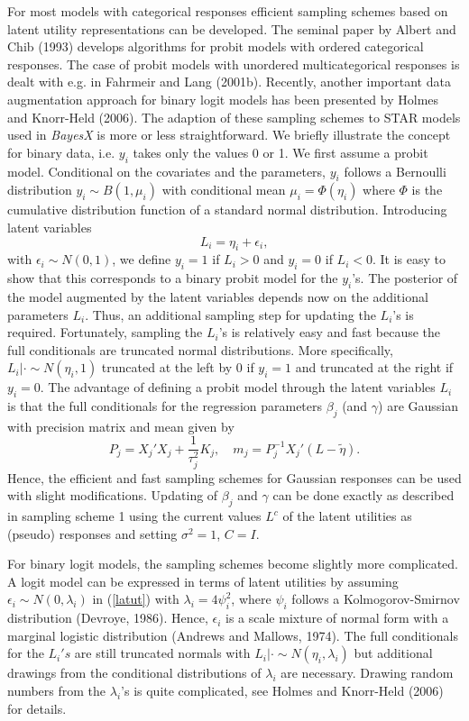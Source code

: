 \documentclass[11pt,a4paper,twoside]{bayesxarticle}
\begin{document}
For most models with categorical responses efficient sampling
schemes based on latent utility representations can be developed.
The seminal paper by Albert and Chib (1993) develops algorithms for
probit models  with  ordered categorical responses. The case of
probit models with unordered multicategorical responses is dealt
with e.g. in Fahrmeir and Lang (2001b). Recently, another important
data augmentation approach for binary logit models has been
presented by Holmes and Knorr-Held (2006). The adaption of these
sampling schemes to STAR models used in {\em BayesX} is more or less
straightforward. We briefly illustrate the concept for binary data,
i.e. $y_i$ takes only the values 0 or 1. We first assume a probit
model. Conditional on the covariates and the parameters, $y_i$
follows a Bernoulli distribution $y_i \sim B(1,\mu_i)$ with
conditional mean $\mu_i = \Phi(\eta_i)$ where $\Phi$ is the
cumulative distribution function of a standard normal distribution.
Introducing latent variables
\begin{equation}
\label{latut} L_i = \eta_i + \epsilon_i,
\end{equation}
with $\epsilon_i \sim N(0,1)$, we define $y_i = 1$ if $L_i > 0$
and $y_i=0$ if $L_i < 0$. It is easy to show that this corresponds
to a binary probit model for the $y_i$'s. The posterior of the
model augmented by the latent variables depends now on the
additional parameters $L_i$. Thus, an additional sampling step for
updating the $L_i$'s is required. Fortunately, sampling the
$L_i$'s is relatively easy and fast because the full conditionals
are truncated normal distributions. More specifically, $L_i |
\cdot \sim N(\eta_i,1)$ truncated at the left by 0 if $y_i=1$ and
truncated at the right if $y_i=0$. The advantage of defining a
probit model through the latent variables $L_i$ is that the full
conditionals for the regression parameters $\beta_j$ (and
$\gamma$) are Gaussian with precision matrix and mean given by
\begin{equation}
\label{prec2} P_j = X_j'X_j + \frac{1}{\tau^2_j}K_j, \quad m_j =
P_j^{-1}X_j'(L-\tilde{\eta}).
\end{equation}
Hence, the efficient and fast sampling schemes for Gaussian
responses can be used with slight modifications. Updating of
$\beta_j$ and $\gamma$ can be done exactly as described in
sampling scheme 1  using the current values $L^c$ of the latent
utilities as (pseudo) responses and setting $\sigma^2=1$, $C=I$.

For binary logit models, the sampling schemes become slightly more
complicated. A logit model can be expressed in terms of latent
utilities by assuming $\epsilon_i \sim N(0,\lambda_i)$ in
(\ref{latut}) with $\lambda_i = 4\psi_i^2$, where $\psi_i$ follows a
Kolmogorov-Smirnov distribution (Devroye, 1986). Hence, $\epsilon_i$
is  a scale mixture of normal form with a marginal logistic
distribution (Andrews and Mallows, 1974). The full conditionals for
the $L_i's$ are still truncated normals with $L_i | \cdot \sim
N(\eta_i,\lambda_i)$ but additional drawings from the conditional
distributions of $\lambda_i$ are necessary. Drawing random numbers
from the $\lambda_i$'s is quite complicated, see Holmes and
Knorr-Held (2006) for details.
\end{document}
